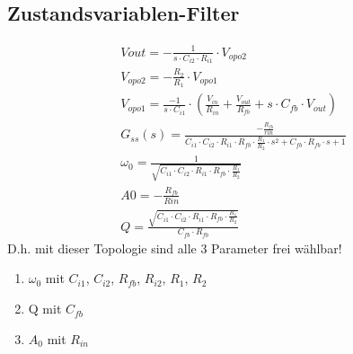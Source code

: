 \subsection{Zustandsvariablen-Filter}
\begin{gather}
V{out}=-\frac{1}{s\cdot C_{i2}\cdot R_{i1}}\cdot V_{opo2}\\
V_{opo2}=-\frac{R_2}{R_1}\cdot V_{opo1}\\
V_{opo1}=\frac{-1}{s\cdot C_{i1}}\cdot (\frac{V_{in}}{R_{in}}+\frac{V_{out}}{R_{fb}}+s\cdot C_{fb}\cdot V_{out})\\
G_{ss}(s)=\frac{-\frac{R_{fb}}{rin}}{C_{i1}\cdot C_{i2}\cdot R_{i1}\cdot R_{fb}\cdot \frac{R_1}{R_2}\cdot s^2+C_{fb}\cdot R_{fb}\cdot s+1}\\
\omega_{0}=\frac{1}{\sqrt{C_{i1}\cdot C_{i2}\cdot R_{i1}\cdot R_{fb}\cdot \frac{R_1}{R_2}}}\\
A0=-\frac{R_{fb}}{Rin}\\
Q=\frac{\sqrt{C_{i1}\cdot C_{i2}\cdot R_{i1}\cdot R_{fb}\cdot \frac{R_1}{R_2}}}{C_{fb}\cdot R_{fb}}
\end{gather}
D.h. mit dieser Topologie sind alle 3 Parameter frei wählbar!
\begin{enumerate}
  \item $\omega_{0}$ mit $C_{i1}$, $C_{i2}$, $R_{fb}$, $R_{i2}$, $R_1$, $R_2$
  \item Q mit $C_{fb}$
  \item $A_0$ mit $R_{in}$
\end{enumerate}


